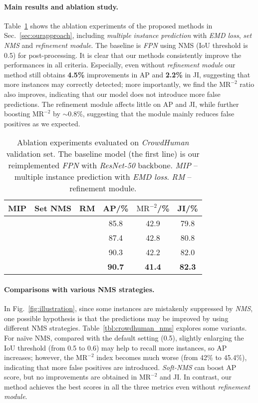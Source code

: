 \documentclass[10pt,twocolumn,letterpaper]{article}
\begin{document}
\paragraph{Main results and ablation study.} Table~\ref{tbl:crowd_ablation} shows the ablation experiments of the proposed methods in Sec.~\ref{sec:ourapproach}, including \emph{multiple instance prediction} with \emph{EMD loss}, \emph{set NMS} and \emph{refinement module}. The baseline is \emph{FPN} \cite{lin2017feature} using NMS (IoU threshold is 0.5) for post-processing. It is clear that our methods consistently improve the performances in all criteria. Especially, even without \emph{refinement module} our method still obtains \textbf{4.5\%} improvements in AP and \textbf{2.2\%} in JI, suggesting that more instances may correctly detected; more importantly, we find the $\text{MR}^{-2}$ ratio also improves, indicating that our model does not introduce more false predictions. The refinement module affects little on AP and JI, while further boosting  $\text{MR}^{-2}$ by $\sim$0.8\%, suggesting that the module mainly reduces false positives as we expected. 

\begin{table}[ht]
	\centering
	\begin{tabular}{ccc|ccc}
		\toprule
		  MIP & Set NMS & RM & AP/\% & $\text{MR}^{-2}$/\%  & JI/\% \\
		\hline
		 & & & 85.8 & 42.9 & 79.8 \\
		\hline 
		\checkmark & & & 87.4 & 42.8 &  80.8  \\
		\checkmark & \checkmark &  & 90.3 & 42.2 &  82.0  \\
		\checkmark & \checkmark & \checkmark & \textbf{90.7} & \textbf{41.4} &  \textbf{82.3}  \\
		\bottomrule
	\end{tabular}
	\caption{ Ablation experiments evaluated on \emph{CrowdHuman} validation set. The baseline model (the first line) is our reimplemented \emph{FPN} \cite{lin2017feature} with \emph{ResNet-50} \cite{he2016deep} backbone. \emph{MIP} -- multiple instance prediction with \emph{EMD loss}. \emph{RM} -- refinement module.  }
	\label{tbl:crowd_ablation}
\end{table}

\paragraph{Comparisons with various NMS strategies. }
In Fig.~\ref{fig:illustration}, since some instances are mistakenly suppressed by \emph{NMS}, one possible hypothesis is that the predictions may be improved by using different NMS strategies. Table~\ref{tbl:crowdhuman_nms} explores some variants. For na\"ive NMS, compared with the default setting (0.5), slightly enlarging the IoU threshold (from 0.5 to 0.6) may help to recall more instances, so AP increases; however, the $\text{MR}^{-2}$ index becomes much worse (from 42\% to 45.4\%), indicating that more false positives are introduced. \emph{Soft-NMS} \cite{softnms} can boost AP score, but no improvements are obtained in $\text{MR}^{-2}$ and JI. In contrast, our method achieves the best scores in all the three metrics even without \emph{refinement module}. 
\end{document}
